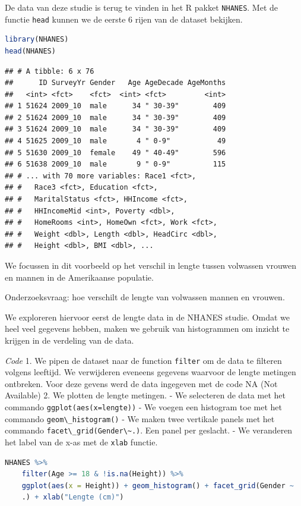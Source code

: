 \documentclass[
  12pt,dutch,coursenotes]{book}
\newcommand{\passthrough}[1]{#1}
\begin{document}
De data van deze studie is terug te vinden in het R pakket \passthrough{\lstinline!NHANES!}. Met de functie \passthrough{\lstinline!head!} kunnen we de eerste 6 rijen van de dataset bekijken.

\begin{lstlisting}[language=R]
library(NHANES)
head(NHANES)
\end{lstlisting}

\begin{lstlisting}
## # A tibble: 6 x 76
##      ID SurveyYr Gender   Age AgeDecade AgeMonths
##   <int> <fct>    <fct>  <int> <fct>         <int>
## 1 51624 2009_10  male      34 " 30-39"        409
## 2 51624 2009_10  male      34 " 30-39"        409
## 3 51624 2009_10  male      34 " 30-39"        409
## 4 51625 2009_10  male       4 " 0-9"           49
## 5 51630 2009_10  female    49 " 40-49"        596
## 6 51638 2009_10  male       9 " 0-9"          115
## # ... with 70 more variables: Race1 <fct>,
## #   Race3 <fct>, Education <fct>,
## #   MaritalStatus <fct>, HHIncome <fct>,
## #   HHIncomeMid <int>, Poverty <dbl>,
## #   HomeRooms <int>, HomeOwn <fct>, Work <fct>,
## #   Weight <dbl>, Length <dbl>, HeadCirc <dbl>,
## #   Height <dbl>, BMI <dbl>, ...
\end{lstlisting}

We focussen in dit voorbeeld op het verschil in lengte tussen volwassen vrouwen en mannen in de Amerikaanse populatie.

Onderzoeksvraag: hoe verschilt de lengte van volwassen mannen en vrouwen.

We exploreren hiervoor eerst de lengte data in de NHANES studie. Omdat we heel veel gegevens hebben, maken we gebruik van histogrammen om inzicht te krijgen in de verdeling van de data.

\emph{Code}
1. We pipen de dataset naar de function \passthrough{\lstinline!filter!} om de data te filteren volgens leeftijd. We verwijderen eveneens gegevens waarvoor de lengte metingen ontbreken. Voor deze gevens werd de data ingegeven met de code NA (Not Available)
2. We plotten de lengte metingen.
- We selecteren de data met het commando \passthrough{\lstinline!ggplot(aes(x=lengte))!}
- We voegen een histogram toe met het commando \passthrough{\lstinline!geom\_histogram()!}
- We maken twee vertikale panels met het commando \passthrough{\lstinline!facet\_grid(Gender\~.)!}. Een panel per geslacht.
- We veranderen het label van de x-as met de \passthrough{\lstinline!xlab!} functie.

\begin{lstlisting}[language=R]
NHANES %>%
    filter(Age >= 18 & !is.na(Height)) %>%
    ggplot(aes(x = Height)) + geom_histogram() + facet_grid(Gender ~
    .) + xlab("Lengte (cm)")
\end{lstlisting}
\end{document}
